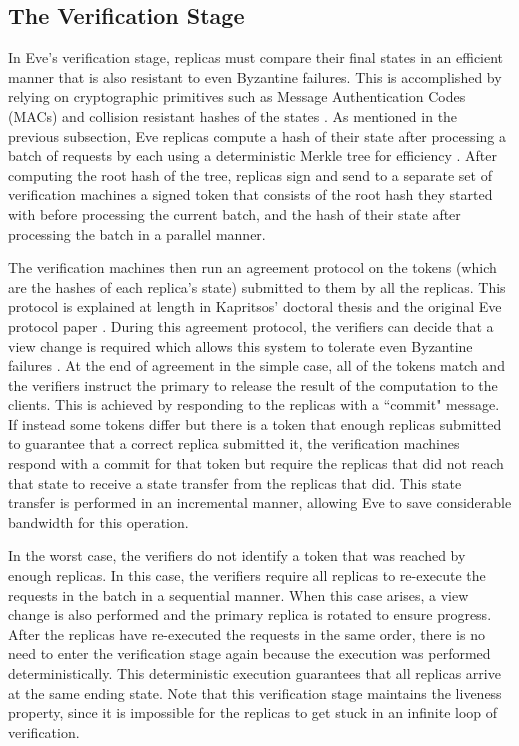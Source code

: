 \documentclass[11pt, oneside]{report}
\begin{document}
\subsection{The Verification Stage}\label{EveVerification}
In Eve's verification stage, replicas must compare their final states in an efficient manner that is also resistant to even Byzantine failures. 
This is accomplished by relying on cryptographic primitives such as Message Authentication Codes (MACs) and collision resistant hashes of the states \cite{eve}. 
As mentioned in the previous subsection, Eve replicas compute a hash of their state after processing a batch of requests by each using a deterministic Merkle tree for efficiency \cite{eve}. 
After computing the root hash of the tree, replicas sign and send to a separate set of verification machines a signed token that consists of the root hash they started with before processing the current batch, and the hash of their state after processing the batch in a parallel manner.

The verification machines then run an agreement protocol on the tokens (which are the hashes of each replica's state) submitted to them by all the replicas. This protocol is explained at length in Kapritsos' doctoral thesis and the original Eve protocol paper \cite{manosThesis, eve}.
During this agreement protocol, the verifiers can decide that a view change is required which allows this system to tolerate even Byzantine failures \cite{upRight}.
At the end of agreement in the simple case, all of the tokens  match and the verifiers instruct the primary to release the result of the computation to the clients. 
This is achieved by responding to the replicas with a ``commit" message. 
If instead some tokens differ but there is a token that enough replicas submitted to guarantee that a correct replica submitted it, the verification machines respond with a commit for that token but require the replicas that did not reach that state to receive a state transfer from the replicas that did. 
This state transfer is performed in an incremental manner, allowing Eve to save considerable bandwidth for this operation.

In the worst case, the verifiers do not identify a token that was reached by enough replicas. 
In this case, the verifiers require all replicas to re-execute the requests in the batch in a sequential manner. 
When this case arises, a view change is also performed and the primary replica is rotated to ensure progress.
After the replicas have re-executed the requests in the same order, there is no need to enter the verification stage again because the execution was performed deterministically. 
This deterministic execution guarantees that all replicas arrive at the same ending state.
Note that this verification stage maintains the liveness property, since it is impossible for the replicas to get stuck in an infinite loop of verification.
\end{document}
